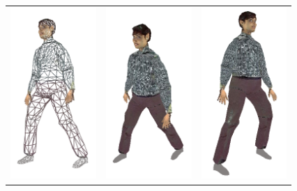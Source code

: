 \documentclass[10pt,oneside,fleqn,a4paper]{book}
\begin{document}
\begin{figure}
\begin{center}
\begin{tabular}{ccc}
\includegraphics[height=6.5cm]{../images/rupal_wireframe} & \includegraphics[height=6.5cm]{../images/rupal_1} & \includegraphics[height=6.5cm]{../images/rupal_2} \\

\end{tabular}
\end{center}
\end{figure}
\end{document}
